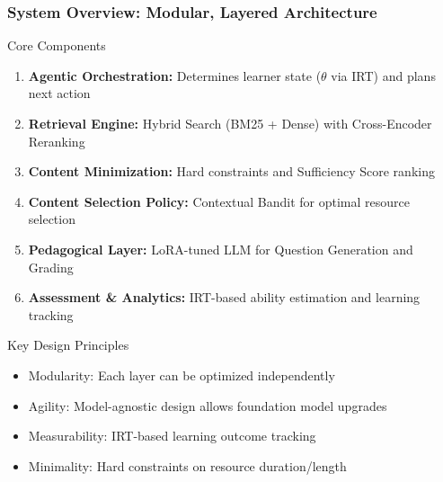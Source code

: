 \documentclass[aspectratio=169]{beamer}
\begin{document}
\begin{frame}
\frametitle{System Overview: Modular, Layered Architecture}
\begin{block}{Core Components}
\begin{enumerate}
\item \textbf{Agentic Orchestration:} Determines learner state ($\theta$ via IRT) and plans next action
\item \textbf{Retrieval Engine:} Hybrid Search (BM25 + Dense) with Cross-Encoder Reranking
\item \textbf{Content Minimization:} Hard constraints and Sufficiency Score ranking
\item \textbf{Content Selection Policy:} Contextual Bandit for optimal resource selection
\item \textbf{Pedagogical Layer:} LoRA-tuned LLM for Question Generation and Grading
\item \textbf{Assessment \& Analytics:} IRT-based ability estimation and learning tracking
\end{enumerate}
\end{block}

\begin{block}{Key Design Principles}
\begin{itemize}
\item \textcolor{mygreen}{Modularity:} Each layer can be optimized independently
\item \textcolor{mygreen}{Agility:} Model-agnostic design allows foundation model upgrades
\item \textcolor{mygreen}{Measurability:} IRT-based learning outcome tracking
\item \textcolor{mygreen}{Minimality:} Hard constraints on resource duration/length
\end{itemize}
\end{block}
\end{frame}
\end{document}
